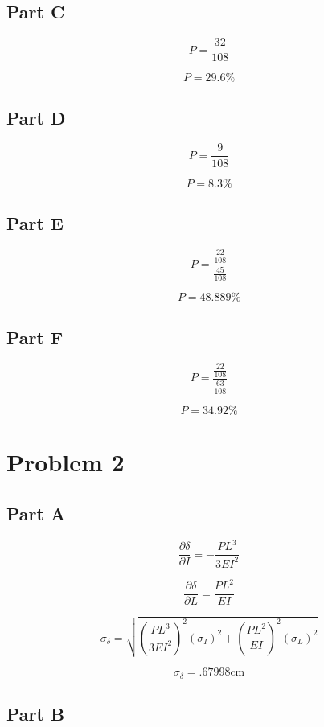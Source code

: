\documentclass[]{report}
\begin{document}
			\subsection{Part C}
			
			$$ P = \frac{32}{108}$$
			
			$$ P =  29.6 \% $$
			
			
			\subsection{Part D}
			
			
			$$ P = \frac{9}{108} $$
			
			$$P = 8.3\%$$
			
			\subsection{Part E}
			
			
			$$ P = \frac{\frac{22}{108}}{\frac{45}{108}} $$
			
			$$ P = 48.889 \% $$
			
			\subsection{Part F}
			
			$$ P = \frac{\frac{22}{108}}{\frac{63}{108}} $$
			
			$$ P = 34.92\% $$
			
			
			\newpage
			
			
		\section{Problem 2}
		
		\subsection{Part A}
		
		$$ \frac{\partial \delta}{\partial I} = - \frac{P L^3}{3 E I^2} $$
		
		$$ \frac{\partial \delta}{\partial L} = \frac{P L^2}{ E I} $$
		
		
		$$ \sigma_{\delta} = \sqrt{   (\frac{P L^3}{3 E I^2})^2  (\sigma_{I})^2   + (\frac{P L^2}{ E I})^2   (\sigma_{L})^2}$$
		
		$$ \sigma_{\delta} = . 67998 \text{cm} $$
		
		
		\subsection{Part B}
		
\end{document}
